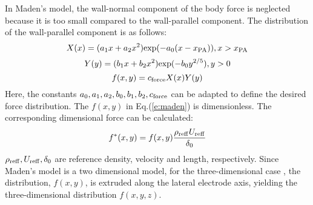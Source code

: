 \documentclass{AIAA}
\begin{document}
In Maden's model, the wall-normal component of the body force is neglected because it is too small compared to the wall-parallel component. The distribution of the wall-parallel component is as follows:
\begin{equation}
    \label{e:madenX}
    X(x)=(a_1x+a_2x^2){\rm exp}(-a_0(x-x_{\rm PA})),x>x_{\rm PA}
\end{equation}
\begin{equation}
    \label{e:madenY}
    Y(y)=(b_1x+b_2x^2){\rm exp}(-b_0y^{2/5}),y>0
\end{equation}
\begin{equation}
    \label{e:maden}
    f(x,y)=c_{\rm force}X(x)Y(y)
\end{equation}
Here, the constants $a_0,a_1,a_2,b_0,b_1,b_2,c_{\rm force}$ can be adapted to define the desired force distribution. The $f(x,y)$ in Eq.(\ref{e:maden}) is dimensionless. The corresponding dimensional force can be calculated:
\begin{equation}
    f^*(x,y)=f(x,y)\frac{\rho_{\rm reff}U_{\rm reff}}{\delta_{0}}
\end{equation}
$\rho_{\rm reff},U_{\rm reff},\delta_{0}$ are reference density, velocity and length, respectively. Since Maden's model is a two dimensional model, for the three-dimensional case , the distribution, $f(x,y)$, is extruded along the lateral electrode axis, yielding the three-dimensional distribution $f(x,y,z)$.
\end{document}
